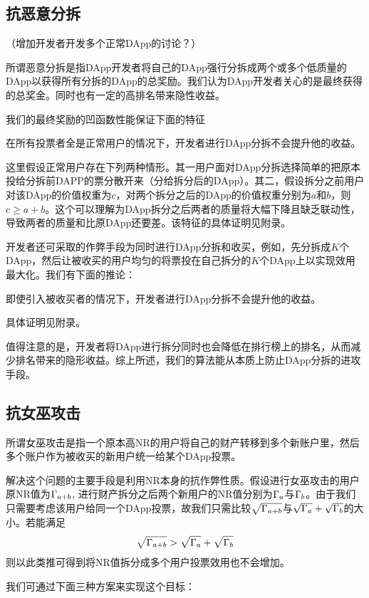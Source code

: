 \subsection{抗恶意分拆}
（增加开发者开发多个正常DApp的讨论？）

所谓恶意分拆是指DApp开发者将自己的DApp强行分拆成两个或多个低质量的DApp以获得所有分拆的DApp的总奖励。我们认为DApp开发者关心的是最终获得的总奖金。同时也有一定的高排名带来隐性收益。

我们的最终奖励的凹函数性能保证下面的特征
\begin{property}
	在所有投票者全是正常用户的情况下，开发者进行DApp分拆不会提升他的收益。
\end{property}
这里假设正常用户存在下列两种情形。其一用户面对DApp分拆选择简单的把原本投给分拆前DAPP的票分散开来（分给拆分后的DApp）。其二，假设拆分之前用户对该DApp的价值权重为$c$，对两个拆分之后的DApp的价值权重分别为$a$和$b$，则$c \geq a+b$。这个可以理解为DApp拆分之后两者的质量将大幅下降且缺乏联动性，导致两者的质量和比原DApp还要差。该特征的具体证明见附录。

开发者还可采取的作弊手段为同时进行DApp分拆和收买，例如，先分拆成$K$个DApp，然后让被收买的用户均匀的将票投在自己拆分的$K$个DApp上以实现效用最大化。我们有下面的推论：
\begin{corollary}
	即使引入被收买者的情况下，开发者进行DApp分拆不会提升他的收益。
\end{corollary}
具体证明见附录。

值得注意的是，开发者将DApp进行拆分同时也会降低在排行榜上的排名，从而减少排名带来的隐形收益。综上所述，我们的算法能从本质上防止DApp分拆的进攻手段。

\subsection{抗女巫攻击}
所谓女巫攻击是指一个原本高NR的用户将自己的财产转移到多个新账户里，然后多个账户作为被收买的新用户统一给某个DApp投票。

解决这个问题的主要手段是利用NR本身的抗作弊性质。假设进行女巫攻击的用户原NR值为$\Gamma_{a+b}$, 进行财产拆分之后两个新用户的NR值分别为$\Gamma_a$与$\Gamma_b$。由于我们只需要考虑该用户给同一个DApp投票，故我们只需比较$\sqrt{\Gamma_{a+b}}$与$\sqrt{\Gamma_a}+\sqrt{\Gamma_b}$的大小。若能满足
\begin{align}
\label{sybil}
\sqrt{\Gamma_{a+b}}>\sqrt{\Gamma_a}+\sqrt{\Gamma_b}
\end{align}
则以此类推可得到将NR值拆分成多个用户投票效用也不会增加。

我们可通过下面三种方案来实现这个目标：

